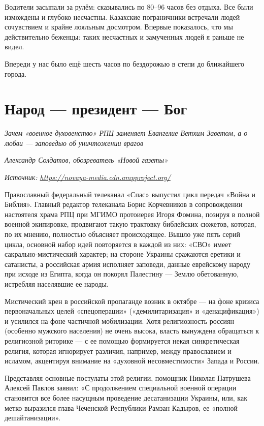 Водители засыпали за рулём: сказывались по 80–96 часов без отдыха. Все были измождены и глубоко несчастны. Казахские пограничники встречали людей сочувствием и крайне лояльным досмотром. Впервые показалось, что мы действительно беженцы: таких несчастных и замученных людей я раньше не видел.

Впереди у нас было ещё шесть часов по бездорожью в степи до ближайшего города.


\newpage
\section{Народ — президент — Бог}


\textit{Зачем «военное духовенство» РПЦ заменяет Евангелие Ветхим Заветом, а  о любви — заповедью об уничтожении врагов }

\textit{Александр Солдатов, обозреватель «Новой газеты»}

\textit{Источник: \url{https://novaya-media.cdn.ampproject.org/}}

Православный федеральный телеканал «Спас» выпустил цикл передач «Война и Библия». Главный редактор телеканала Борис Корчевников в сопровождении настоятеля храма РПЦ при МГИМО протоиерея Игоря Фомина, позируя в полной военной экипировке, продвигают такую трактовку библейских сюжетов, которая, по их мнению, полностью объясняет происходящее. Вышло уже пять серий цикла, основной набор идей повторяется в каждой из них: «СВО» имеет сакрально-мистический характер; на стороне Украины сражаются еретики и сатанисты, а российская армия исполняет заповеди, данные еврейскому народу при исходе из Египта, когда он покорял Палестину — Землю обетованную, истребляя населявшие ее народы.

Мистический крен в российской пропаганде возник в октябре — на фоне кризиса первоначальных целей «спецоперации» («демилитаризация» и «денацификация») и усилился на фоне частичной мобилизации. Хотя религиозность россиян (особенно мужского населения) не очень высока, власть вынуждена обращаться к религиозной риторике — с ее помощью формируется некая синкретическая религия, которая игнорирует различия, например, между православием и исламом, акцентируя внимание на «духовной несовместимости» Запада и России.

Представляя основные постулаты этой религии, помощник Николая Патрушева Алексей Павлов заявил: «С продолжением специальной военной операции становится все более насущным проведение десатанизации Украины, или, как метко выразился глава Чеченской Республики Рамзан Кадыров, ее «полной дешайтанизации».

